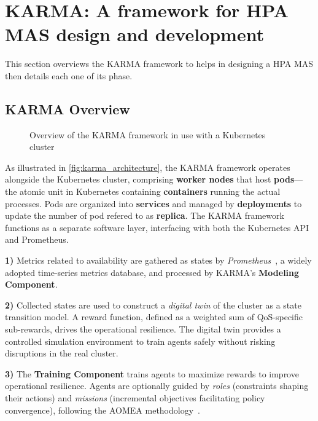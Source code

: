 \documentclass[conference]{IEEEtran}
\begin{document}
\section{KARMA: A framework for HPA MAS design and development}
\label{sec:proposed_approach}

This section overviews the KARMA framework to helps in designing a HPA MAS then details each one of its phase.

\subsection{KARMA Overview}

\begin{figure}[h!]
    \centering
    
    \caption{Overview of the KARMA framework in use with a Kubernetes cluster}
    \label{fig:karma_architecture}
\end{figure}

As illustrated in \autoref{fig:karma_architecture}, the KARMA framework operates alongside the Kubernetes cluster, comprising \textbf{worker nodes} that host \textbf{pods}—the atomic unit in Kubernetes containing \textbf{containers} running the actual processes. Pods are organized into \textbf{services} and managed by \textbf{deployments} to update the number of pod refered to as \textbf{replica}. The KARMA framework functions as a separate software layer, interfacing with both the Kubernetes API and Prometheus.

\textbf{1)} Metrics related to availability are gathered as states by \textit{Prometheus}~\cite{prometheus}, a widely adopted time-series metrics database, and processed by KARMA's \textbf{Modeling Component}.

\textbf{2)} Collected states are used to construct a \textit{digital twin} of the cluster as a state transition model. A reward function, defined as a weighted sum of QoS-specific sub-rewards, drives the operational resilience. The digital twin provides a controlled simulation environment to train agents safely without risking disruptions in the real cluster.

\textbf{3)} The \textbf{Training Component} trains agents to maximize rewards to improve operational resilience. Agents are optionally guided by \textit{roles} (constraints shaping their actions) and \textit{missions} (incremental objectives facilitating policy convergence), following the AOMEA methodology~\cite{soule2024aomea}.
\end{document}
